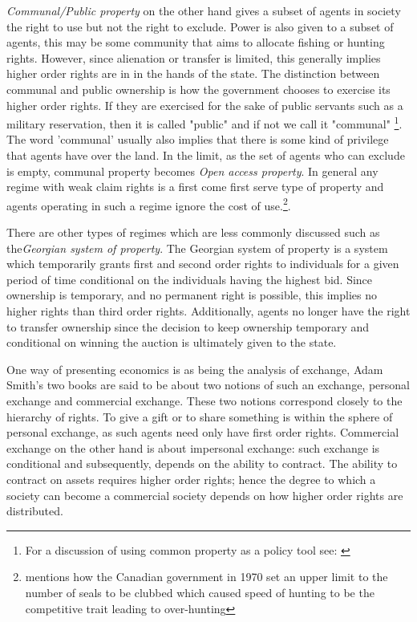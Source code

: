 \documentclass[12pt]{report}
\numberwithin{equation}{section}
\begin{document}
\textit{Communal/Public property} on the other hand gives a subset of agents in society the right to use but not the right to exclude. Power is also given to a subset of agents, this may be some community that aims to allocate fishing or hunting rights.
However, since alienation or transfer is limited, this generally implies higher order rights are in in the hands of the state. The distinction between communal and public ownership is how the government chooses to exercise its higher order rights. If they are exercised for the sake of public servants such as a military reservation, then it is called "public" and if not we call it "communal" \footnote{For a discussion of using common property as a policy tool see: \cite{ciriacy1975common}}. The word 'communal' usually also implies that there is some kind of privilege that agents have over the land. In the limit, as the set of agents who can exclude is empty, communal property becomes \textit{Open access property}. In general any regime with weak claim rights is a first come first serve type of property and agents operating in such a regime ignore the cost of use.\footnote{\cite{Alchian1973} mentions how the Canadian government in 1970 set an upper limit to the number of seals to be clubbed which caused speed of hunting to be the competitive trait leading to over-hunting}.

There are other types of regimes which are less commonly discussed such as the\textit{Georgian system of property}. The Georgian system of property is a system which temporarily grants first and second order rights to individuals for a given period of time conditional on the individuals having the highest bid. Since ownership is temporary, and no permanent right is possible, this implies no higher rights than third order rights. Additionally, agents no longer have the right to transfer ownership since the decision to keep ownership temporary and conditional on winning the auction is ultimately given to the state.

One way of presenting economics is as being the analysis of exchange, Adam Smith's two books are said to be about two notions of such an exchange, personal exchange and commercial exchange. These two notions correspond closely to the hierarchy of rights. To give a gift or to share something is within the sphere of personal exchange, as such agents need only have first order rights. Commercial exchange on the other hand is about impersonal exchange: such exchange is conditional and subsequently, depends on the ability to contract. The ability to contract on assets requires higher order rights; hence the degree to which a society can become a commercial society depends on how higher order rights are distributed. 
\end{document}
